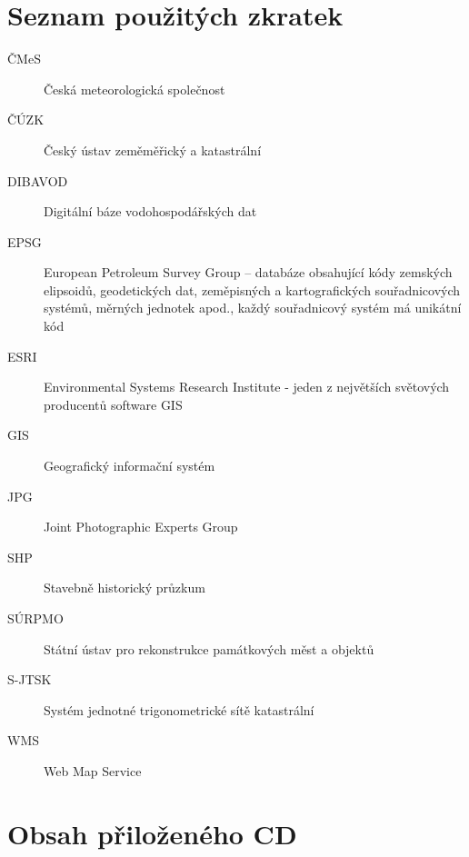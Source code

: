 \documentclass[thesis=M,czech]{FITthesis}[2012/06/26]
\begin{document}
\chapter{Seznam použitých zkratek}
\begin{description}
	\item[ČMeS] Česká meteorologická společnost
	\item[ČÚZK] Český ústav zeměměřický a katastrální
	\item[DIBAVOD] Digitální báze vodohospodářských dat
	\item[EPSG] European Petroleum Survey Group – databáze obsahující kódy zemských elipsoidů, geodetických dat, zeměpisných a kartografických souřadnicových systémů, měrných jednotek apod., každý souřadnicový systém má unikátní kód
	\item[ESRI] Environmental Systems Research Institute - jeden z největších světových producentů software GIS
	\item[GIS] Geografický informační systém
	\item[JPG] Joint Photographic Experts Group
	\item[SHP] Stavebně historický průzkum
	\item[SÚRPMO] Státní ústav pro rekonstrukce památkových měst a objektů
	\item[S-JTSK] Systém jednotné trigonometrické sítě katastrální
	\item[WMS] Web Map Service

\end{description}



\chapter{Obsah přiloženého CD}

\begin{figure}
\end{figure}
\end{document}
